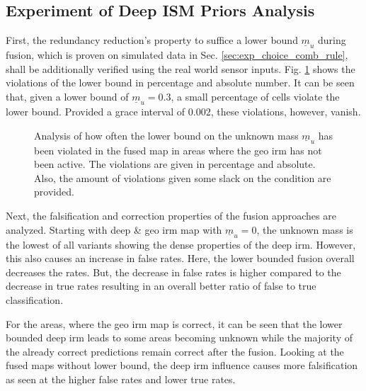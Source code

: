 \subsection{Experiment of Deep ISM Priors Analysis}
\label{subsec:exp_of_prior_analy}
First, the redundancy reduction's property to suffice a lower bound $\underline{m}_u$ during fusion, which is proven on simulated data in Sec. \ref{sec:exp_choice_comb_rule}, shall be additionally verified using the real world sensor inputs. Fig. \ref{tab:prior_violations} shows the violations of the lower bound in percentage and absolute number. It can be seen that, given a lower bound of $\underline{m}_u = 0.3$, a small percentage of cells violate the lower bound. Provided a grace interval of $0.002$, these violations, however, vanish.
\begin{figure}[H]
	\begin{center}
		\caption{\label{tab:prior_violations}Analysis of how often the lower bound on the unknown mass $\underline{m}_u$ has been violated in the fused map in areas where the geo \gls{irm} has not been active. The violations are given in percentage and absolute. Also, the amount of violations given some slack on the condition are provided.}
	\end{center}
\end{figure}
Next, the falsification and correction properties of the fusion approaches are analyzed. Starting with deep \& geo \gls{irm} map with $\underline{m}_u=0$, the unknown mass is the lowest of all variants showing the dense properties of the deep \gls{irm}. However, this also causes an increase in false rates. Here, the lower bounded fusion overall decreases the rates. But, the decrease in false rates is higher compared to the decrease in true rates resulting in an overall better ratio of false to true classification. 

For the areas, where the geo \gls{irm} map is correct, it can be seen that the lower bounded deep \gls{irm} leads to some areas becoming unknown while the majority of the already correct predictions remain correct after the fusion. Looking at the fused maps without lower bound, the deep \gls{irm} influence causes more falsification as seen at the higher false rates and lower true rates.

